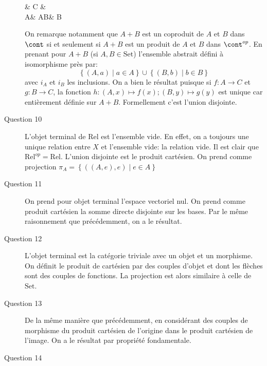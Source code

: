 \documentclass[math]{cours}
\begin{document}
\begin{description}
\begin{category}[]
			& C &\\
			A\arrow[ur, "f"]\arrow[r, "i_{A}" swap] & A\bigsqcup B\arrow[dashed, "h", u] & B\arrow[ul, "g" swap]\arrow[l, "i_{2}"]
		\end{category}
		On remarque notamment que $A + B$ est un coproduit de $A$ et $B$ dans $\cont$ si et seulement si $A + B$ est un produit de $A$ et $B$ dans $\cont^{op}$.
		En prenant pour $A + B$ (si $A, B \in \mathrm{Set}$) l'ensemble abstrait défini à isomorphisme près par:
		\begin{equation*}
			\left\{ (A, a) \mid a\in A \right\} \cup \left\{ (B, b) \mid b \in B \right\}
		\end{equation*}
		avec $i_{A}$ et $i_{B}$ les inclusions.
		On a bien le résultat puisque si $f: A \to C$ et $g: B\to C$, la fonction $h: (A, x) \mapsto f(x); (B, y) \mapsto g(y)$ est unique car entièrement définie sur $A + B$.
		Formellement c'est l'union disjointe.
	\item[Question 10] L'objet terminal de $\mathrm{Rel}$ est l'ensemble vide. En effet, on a toujours une unique relation entre $X$ et l'ensemble vide: la relation vide.
		Il est clair que $\mathrm{Rel}^{op} = \mathrm{Rel}$.
		L'union disjointe est le produit cartésien.
		On prend comme projection $\pi_{A} = \left\{ \left( (A, e), e \right)\mid e \in A \right\}$
	\item[Question 11] On prend pour objet terminal l'espace vectoriel nul.
		On prend comme produit cartésien la somme directe disjointe sur les bases.
		Par le même raisonnement que précédemment, on a le résultat.
	\item[Question 12] L'objet terminal est la catégorie triviale avec un objet et un morphisme.
		On définit le produit de cartésien par des couples d'objet et dont les flèches sont des couples de fonctions.
		La projection est alors similaire à celle de $\mathrm{Set}$.
	\item[Question 13] De la même manière que précédemment, en considérant des couples de morphisme du produit cartésien de l'origine dans le produit cartésien de l'image.
		On a le résultat par propriété fondamentale.
	\item[Question 14]
\end{description}
\end{document}
